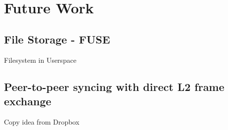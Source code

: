 
\chapter{Future Work}



\section{File Storage - FUSE}
  Filesystem in Userspace

\section{Peer-to-peer syncing with direct L2 frame exchange}
  Copy idea from Dropbox